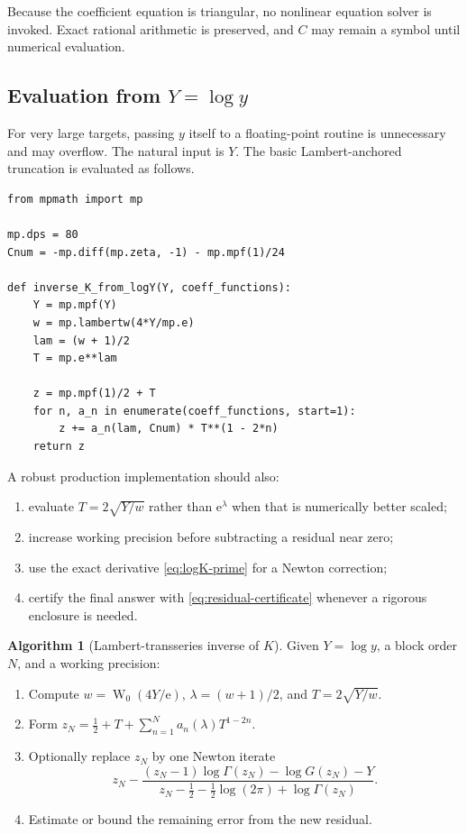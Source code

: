 \documentclass[11pt,oneside]{article}
\theoremstyle{plain}
\theoremstyle{definition}
\newtheorem{algorithm}[theorem]{Algorithm}
\theoremstyle{remark}
\newcommand{\W}{\operatorname{W}}
\newcommand{\e}{\mathrm{e}}
\begin{document}
Because the coefficient equation is triangular, no nonlinear equation solver
is invoked.  Exact rational arithmetic is preserved, and \(C\) may remain a
symbol until numerical evaluation.

\subsection{Evaluation from \(Y=\log y\)}

For very large targets, passing \(y\) itself to a floating-point routine is
unnecessary and may overflow.  The natural input is \(Y\).  The basic
Lambert-anchored truncation is evaluated as follows.

\begin{lstlisting}
from mpmath import mp

mp.dps = 80
Cnum = -mp.diff(mp.zeta, -1) - mp.mpf(1)/24

def inverse_K_from_logY(Y, coeff_functions):
    Y = mp.mpf(Y)
    w = mp.lambertw(4*Y/mp.e)
    lam = (w + 1)/2
    T = mp.e**lam

    z = mp.mpf(1)/2 + T
    for n, a_n in enumerate(coeff_functions, start=1):
        z += a_n(lam, Cnum) * T**(1 - 2*n)
    return z
\end{lstlisting}

A robust production implementation should also:
\begin{enumerate}
 \item evaluate \(T=2\sqrt{Y/w}\) rather than \(\e^\lambda\) when that is
       numerically better scaled;
 \item increase working precision before subtracting a residual near zero;
 \item use the exact derivative \cref{eq:logK-prime} for a Newton correction;
 \item certify the final answer with \cref{eq:residual-certificate} whenever a
       rigorous enclosure is needed.
\end{enumerate}

\begin{algorithm}[Lambert-transseries inverse of \(K\)]
\label{alg:inverse-K}
Given \(Y=\log y\), a block order \(N\), and a working precision:
\begin{enumerate}
 \item Compute \(w=\W_0(4Y/\e)\), \(\lambda=(w+1)/2\), and
       \(T=2\sqrt{Y/w}\).
 \item Form
       \(z_N=\tfrac12+T+\sum_{n=1}^{N}a_n(\lambda)T^{1-2n}\).
 \item Optionally replace \(z_N\) by one Newton iterate
       \begin{equation*}
       z_N-\frac{(z_N-1)\log\Gamma(z_N)-\log G(z_N)-Y}
       {z_N-\tfrac12-\tfrac12\log(2\pi)+\log\Gamma(z_N)}.
       \end{equation*}
 \item Estimate or bound the remaining error from the new residual.
\end{enumerate}
\end{algorithm}
\end{document}
